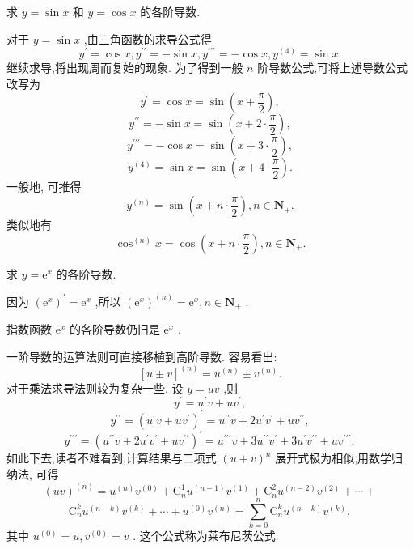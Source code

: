 \begin{example}
求 \(y = \sin x\) 和 \(y = \cos x\) 的各阶导数.
\end{example}


\begin{solution}
对于 \(y = \sin x\) ,由三角函数的求导公式得
\[
{y}^{\prime } = \cos x,{y}^{\prime \prime } =  - \sin x,{y}^{\prime \prime \prime } =  - \cos x,{y}^{\left( 4\right) } = \sin x.
\]
继续求导,将出现周而复始的现象. 为了得到一般 \(n\) 阶导数公式,可将上述导数公式改写为
\[
{y}^{\prime } = \cos x = \sin \left( {x + \frac{\pi }{2}}\right) ,
\]
\[
{y}^{\prime \prime } =  - \sin x = \sin \left( {x + 2 \cdot  \frac{\pi }{2}}\right) ,
\]
\[
{y}^{\prime \prime \prime } =  - \cos x = \sin \left( {x + 3 \cdot  \frac{\pi }{2}}\right) ,
\]
\[
{y}^{\left( 4\right) } = \sin x = \sin \left( {x + 4 \cdot  \frac{\pi }{2}}\right) .
\]
一般地, 可推得
\[
{y}^{\left( n\right) } = \sin \left( {x + n \cdot  \frac{\pi }{2}}\right) ,n \in  {\mathbf{N}}_{ + }.
\]
类似地有
\[
{\cos }^{\left( n\right) }x = \cos \left( {x + n \cdot  \frac{\pi }{2}}\right) ,n \in  {\mathbf{N}}_{ + }.
\]
\end{solution}

\begin{example}
求 \(y = {\mathrm{e}}^{x}\) 的各阶导数.
\end{example}


\begin{solution}
因为 \({\left( {\mathrm{e}}^{x}\right) }^{\prime } = {\mathrm{e}}^{x}\) ,所以 \({\left( {\mathrm{e}}^{x}\right) }^{\left( n\right) } = {\mathrm{e}}^{x},n \in  {\mathbf{N}}_{ + }\) .
\end{solution}


指数函数 \({\mathrm{e}}^{x}\) 的各阶导数仍旧是 \({\mathrm{e}}^{x}\) .

一阶导数的运算法则可直接移植到高阶导数. 容易看出:
\[
{\left\lbrack  u \pm  v\right\rbrack  }^{\left( n\right) } = {u}^{\left( n\right) } \pm  {v}^{\left( n\right) }. \tag{1}
\]
对于乘法求导法则较为复杂一些. 设 \(y = {uv}\) ,则
\[
{y}^{\prime } = {u}^{\prime }v + u{v}^{\prime },
\]
\[
{y}^{\prime \prime } = {\left( {u}^{\prime }v + u{v}^{\prime }\right) }^{\prime } = {u}^{\prime \prime }v + 2{u}^{\prime }{v}^{\prime } + u{v}^{\prime \prime },
\]
\[
{y}^{\prime \prime \prime } = {\left( {u}^{\prime \prime }v + 2{u}^{\prime }{v}^{\prime } + u{v}^{\prime \prime }\right) }^{\prime } = {u}^{\prime \prime \prime }v + 3{u}^{\prime \prime }{v}^{\prime } + 3{u}^{\prime }{v}^{\prime \prime } + u{v}^{\prime \prime \prime },
\]
如此下去,读者不难看到,计算结果与二项式 \({\left( u + v\right) }^{n}\) 展开式极为相似,用数学归纳法, 可得
\[
{\left( uv\right) }^{\left( n\right) } = {u}^{\left( n\right) }{v}^{\left( 0\right) } + {\mathrm{C}}_{n}^{1}{u}^{\left( n - 1\right) }{v}^{\left( 1\right) } + {\mathrm{C}}_{n}^{2}{u}^{\left( n - 2\right) }{v}^{\left( 2\right) } + \cdots  +
\]
\[
{\mathrm{C}}_{n}^{k}{u}^{\left( n - k\right) }{v}^{\left( k\right) } + \cdots  + {u}^{\left( 0\right) }{v}^{\left( n\right) } = \mathop{\sum }\limits_{{k = 0}}^{n}{\mathrm{C}}_{n}^{k}{u}^{\left( n - k\right) }{v}^{\left( k\right) }, \tag{2}
\]
其中 \({u}^{\left( 0\right) } = u,{v}^{\left( 0\right) } = v\) . 这个公式称为莱布尼茨公式.

